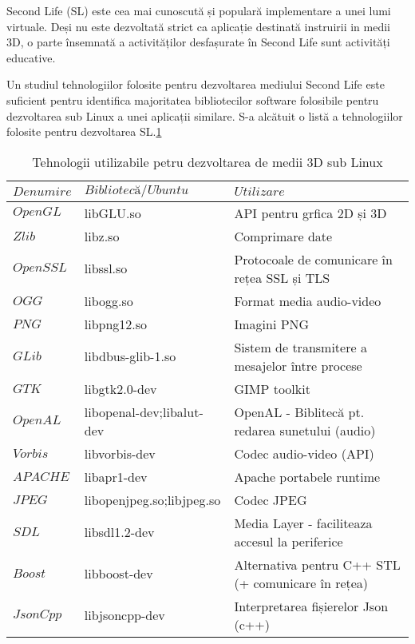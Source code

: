 \par Second Life (SL) este cea mai cunoscută și populară implementare a unei lumi virtuale. Deși nu este dezvoltată strict ca aplicație destinată instruirii in medii 3D, o parte însemnată a activităților desfașurate în Second Life sunt activități educative.
\par Un studiul tehnologiilor folosite pentru dezvoltarea mediului Second Life este suficient pentru  identifica majoritatea bibliotecilor software folosibile pentru dezvoltarea sub Linux a unei aplicații similare. S-a alcătuit o listă a tehnologiilor folosite pentru dezvoltarea SL.\ref{tab:SL_tech}
\begin{table}
      \begin{center}
            \begin{tabular}{|l|l|l|}
                \hline 
                \cline{2-3}
                $Denumire $ & $Bibliotecă/Ubuntu$ & $Utilizare$  \\ 
        	\hline
                $OpenGL$  	&  libGLU.so     	&  API pentru grfica 2D și 3D  \\
                $Zlib$   	&  libz.so     		&  Comprimare date  \\
                
                $OpenSSL$   &  libssl.so    	&  Protocoale de comunicare în rețea SSL și TLS  \\
                $OGG$   	&  libogg.so      	&  Format media audio-video  \\
                $PNG$   	&  libpng12.so      &  Imagini PNG  \\
                $GLib$   	&  libdbus-glib-1.so     &  Sistem de transmitere a mesajelor între procese  \\
                $GTK$   	&  libgtk2.0-dev 	&  GIMP toolkit  \\
                $OpenAL$   	&  libopenal-dev;libalut-dev	&  OpenAL - Biblitecă pt. redarea sunetului (audio) \\
                $Vorbis$   	&  libvorbis-dev 	&  Codec audio-video (API) \\
                $APACHE$   	&  libapr1-dev  	&  Apache portabele runtime  \\
                $JPEG$   	&  libopenjpeg.so;libjpeg.so &  Codec JPEG  \\
                $SDL$   	&  libsdl1.2-dev	&  Media Layer - faciliteaza accesul la periferice  \\
                $Boost$   	&  libboost-dev     &  Alternativa pentru C++ STL (+ comunicare în rețea) \\
                $JsonCpp$  	&  libjsoncpp-dev 	&  Interpretarea fișierelor Json (c++)  \\
            \hline
	    \end{tabular}
        \end{center}
    \caption{Tehnologii utilizabile petru dezvoltarea de medii 3D sub Linux}
    \label{tab:SL_tech}
\end{table}

